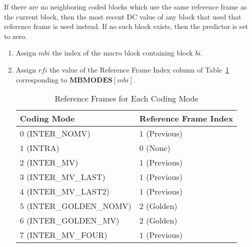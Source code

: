 \documentclass[9pt,letterpaper]{book}
\newcommand{\idx}[1]{{\ensuremath{\mathit{#1}}}}
\newcommand{\bi}{\idx{bi}}
\newcommand{\mbi}{\idx{mbi}}
\newcommand{\rfi}{\idx{rfi}}
\newcommand{\bitvar}[1]{\ensuremath{\mathbf{\bm{#1}}}}
\newcommand{\locvar}[1]{\ensuremath{\mathrm{#1}}}
\numberwithin{equation}{chapter}
\numberwithin{figure}{chapter}
\numberwithin{table}{chapter}
\begin{document}
If there are no neighboring coded blocks which use the same reference frame as
 the current block, then the most recent DC value of any block that used that
 reference frame is used instead.
If no such block exists, then the predictor is set to zero.

\begin{enumerate}
\item
Assign \locvar{\mbi} the index of the macro block containing block
 \bitvar{\bi}.
\item
Assign \locvar{\rfi} the value of the Reference Frame Index column of
 Table~\ref{tab:cm-refs} corresponding to $\bitvar{MBMODES}[\locvar{\mbi}]$.

\begin{table}[htpb]
\begin{center}
\begin{tabular}{ll}\toprule
Coding Mode               & Reference Frame Index \\\midrule
$0$ (INTER\_NOMV)         & $1$ (Previous)        \\
$1$ (INTRA)               & $0$ (None)            \\
$2$ (INTER\_MV)           & $1$ (Previous)        \\
$3$ (INTER\_MV\_LAST)     & $1$ (Previous)        \\
$4$ (INTER\_MV\_LAST2)    & $1$ (Previous)        \\
$5$ (INTER\_GOLDEN\_NOMV) & $2$ (Golden)          \\
$6$ (INTER\_GOLDEN\_MV)   & $2$ (Golden)          \\
$7$ (INTER\_MV\_FOUR)     & $1$ (Previous)        \\
\bottomrule\end{tabular}
\end{center}
\caption{Reference Frames for Each Coding Mode}
\label{tab:cm-refs}
\end{table}


\end{enumerate}
\end{document}
